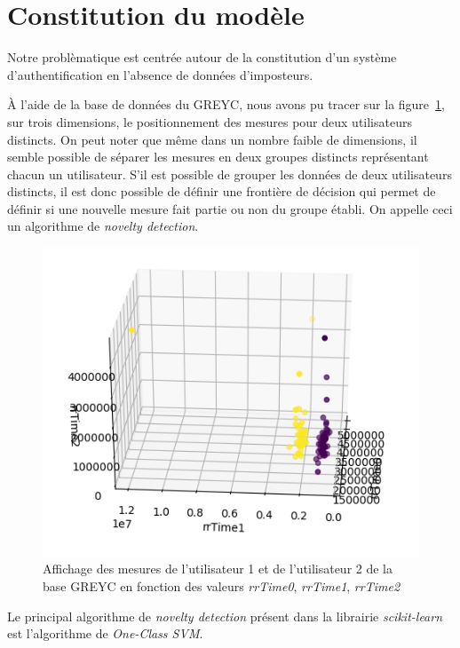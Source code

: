 \section{Constitution du modèle}

Notre problèmatique est centrée autour de la constitution d'un système d'authentification en l'absence de données d'imposteurs.

À l'aide de la base de données du GREYC, nous avons pu tracer sur la figure~\ref{3d}, sur trois dimensions, le positionnement des mesures pour deux utilisateurs distincts. On peut noter que même dans un nombre faible de dimensions, il semble possible de séparer les mesures en deux groupes distincts représentant chacun un utilisateur. S'il est possible de grouper les données de deux utilisateurs distincts, il est donc possible de définir une frontière de décision qui permet de définir si une nouvelle mesure fait partie ou non du groupe établi. On appelle ceci un algorithme de \textit{novelty detection}.

\begin{figure}[b]
    \centering
    \includegraphics[width=\linewidth]{res/3d.png}
    \caption{Affichage des mesures de l'utilisateur 1 et de l'utilisateur 2 de la base GREYC en fonction des valeurs \textit{rrTime0}, \textit{rrTime1}, \textit{rrTime2}}
    \label{3d}
\end{figure}

Le principal algorithme de \textit{novelty detection} présent dans la librairie \textit{scikit-learn} est l'algorithme de \textit{One-Class SVM}.

